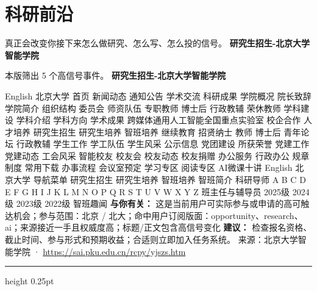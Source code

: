 \documentclass[10.5pt]{ctexart}
\begin{document}
\section*{科研前沿}
{\color{ormuted} 真正会改变你接下来怎么做研究、怎么写、怎么投的信号。}
\vspace{2mm}
{\LARGE\bfseries 研究生招生-北京大学智能学院}\par
\vspace{1mm}
{\color{ormuted} 本版筛出 5 个高信号事件。}
\vspace{3mm}
{\Large\bfseries 研究生招生-北京大学智能学院}\par
English 北京大学 首页 新闻动态 通知公告 学术交流 科研成果 学院概况 院长致辞 学院简介 组织结构 委员会 师资队伍 专职教师 博士后 行政教辅 荣休教师 学科建设 学科介绍 学科方向 学术成果 跨媒体通用人工智能全国重点实验室 校企合作 人才培养 研究生招生 研究生培养 智班培养 继续教育 招贤纳士 教师 博士后 青年论坛 行政教辅 学生工作 学工队伍 学生风采 公示信息 党团建设 所获荣誉 党建工作 党建动态 工会风采 智能校友 校友会 校友动态 校友捐赠 办公服务 行政办公 规章制度 常用下载 办事流程 会议室预定 学习专区 阅读专区 AI微课十讲 English 北京大学 导航菜单 研究生招生 研究生培养 智班培养 智班简介 科研导师 A B C D E F G H I J K L M N O P Q R S T U V W X Y Z 班主任与辅导员 2025级 2024级 2023级 2022级 智班趣闻
\textbf{与你有关：} 这是当前用户可实际参与或申请的高可触达机会；参与范围：北京 / 北大；命中用户订阅版面：opportunity、research、ai；来源接近一手且权威度高；标题/正文包含高信号变化
\textbf{建议：} 检查报名资格、截止时间、参与形式和预期收益；合适则立即加入任务系统。
{\footnotesize\color{ormuted} 来源：北京大学智能学院 · \url{https://sai.pku.edu.cn/rcpy/yjszs.htm}}
\vspace{4mm}
\hrule height 0.25pt
\vspace{3mm}
\end{document}
